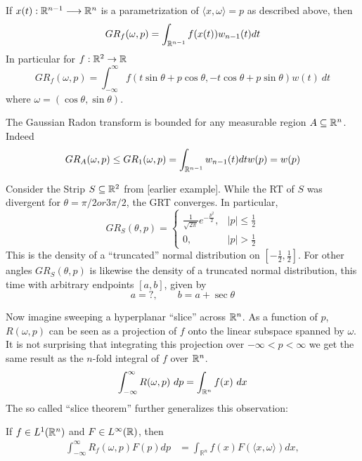 \begin{myexample}
  If $x(t):\mathbb{R}^{n-1} \longrightarrow \mathbb{R}^n$ is a parametrization of $\langle x, \omega\rangle = p$ as described above, then
  \[
    GR_f(\omega, p) = \int_{\mathbb{R}^{n-1}}f(x(t)) w_{n-1}(t) dt
  \]
  In particular for $f:\mathbb{R}^2 \rightarrow \mathbb{R}$
  \[
    GR_f(\omega, p) = \int_{-\infty}^\infty f(t \sin \theta + p \cos \theta, -t \cos \theta + p \sin \theta) w(t)~dt
  \]
  where $\omega = (\cos \theta, \sin \theta)$.
\end{myexample}

\begin{myexample}
  The Gaussian Radon transform is bounded for any measurable region $A \subseteq \mathbb{R}^n$. Indeed 
  \[
      GR_A(\omega, p) \leq GR_1(\omega, p) = \int_{\mathbb{R}^{n-1}} w_{n-1}(t)dt w(p) = w(p)
  \]
\end{myexample}

\begin{myexample}
  Consider the Strip $S \subseteq \mathbb{R}^2$ from [earlier example]. While the RT of $S$ was divergent for $\theta = \pi/2 or 3\pi/2$, the GRT converges. In particular,
  \[
    GR_S(\theta, p)
    = \begin{cases}
      \frac1{\sqrt{2\pi}}e^{-\frac{p^2}2}, & |p| \leq \frac12 \\
      0, & |p| > \frac12
    \end{cases}
  \]
  This is the density of a ``truncated'' normal distribution on $[-\frac12,\frac12]$. For other angles $GR_S(\theta, p)$ is likewise the density of a truncated normal distribution, this time with arbitrary endpoints $[a, b]$, given by
  \[
    a = ?, \qquad b = a + \sec\theta
  \]
\end{myexample}

Now imagine sweeping a hyperplanar ``slice'' across $\mathbb{R}^n$. As a function of $p$, $R(\omega, p)$ can be seen as a projection of $f$ onto the linear subspace spanned by $\omega$. It is not surprising that integrating this projection over $-\infty < p < \infty$ we get the same result as the $n$-fold integral of $f$ over $\mathbb{R}^n$.
\[
    \int_{-\infty}^\infty R(\omega, p) ~dp = \int_{\mathbb{R}^n} f(x) ~dx
\]
The so called ``slice theorem'' further generalizes this observation:

\begin{proposition}[Slice Theorem]
  If $f \in L^1(\mathbb{R}^n)$ and $F \in L^\infty(\mathbb{R})$, then
  \begin{align}
    \label{eq:ST}
    \int_{-\infty}^\infty R_f(\omega, p) F(p) dp 
    &= \int_{\mathbb{R}^n} f(x) F(\langle x, \omega \rangle) dx,
  \end{align}
\end{proposition}

